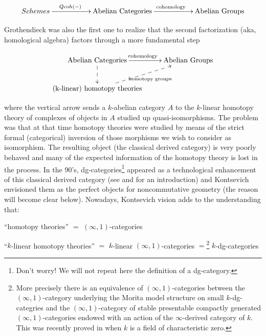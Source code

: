 \begin{refsection}
$$
\xymatrix{
Schemes \ar[rr]^(0.4){Qcoh(-)}&& \text{Abelian Categories}\ar[rr]^{\text{cohomology}}&& \text{Abelian Groups} 
}
$$

Grothendieck was also the first one to realize that the second factorization (aka, homological algebra) factors through a more fundamental step

$$
\xymatrix{
\text{Abelian Categories}\ar@{-->}[d]\ar[r]^{\text{cohomology}}& \text{Abelian Groups} \\
\text{(k-linear) homotopy theories}\ar@{-->}[ru]_{\text{homotopy groups}}&
}
$$

\noindent where the vertical arrow sends a $k$-abelian category $A$ to the $k$-linear homotopy theory of complexes of objects in $A$ studied up quasi-isomorphisms. 
The problem was that at that time homotopy theories were studied by means of the strict formal (categorical) inversion of those morphisms we wish to consider as isomorphism. The resulting object (the classical derived category) is very poorly behaved and many of the expected information of the homotopy theory is lost in the process. In the 90's, dg-categories\footnote{Don't worry! We will not repeat here the definition of a dg-category.} appeared as a technological enhancement of this classical derived category (see \cite{bondal-kapranov3,bondal-kapranov2,bondal-kapranov} and \cite{ondgcategories, sedano} for an introduction) and Kontsevich envisioned them as the perfect objects for noncommutative geometry (the reason will become clear below). Nowadays, Kontsevich vision adds to the understanding that:\\

\begin{center}
``homotopy theories'' $=$ $(\infty,1)$-categories\\
\end{center}

\begin{center}
``$k$-linear homotopy theories'' $=$ $k$-linear $(\infty,1)$-categories $=$\footnote{More precisely there is an equivalence of $(\infty,1)$-categories between the $(\infty,1)$-category underlying the Morita model structure on small $k$-dg-categries and the $(\infty,1)$-category of stable presentable compactly generated $(\infty,1)$-categories endowed with an action of the $\infty$-derived category of $k$.  This was recently proved in \cite{dgklinear} when $k$ is a field of characteristic zero.} $k$-dg-categories\\
\end{center}



\end{refsection}
